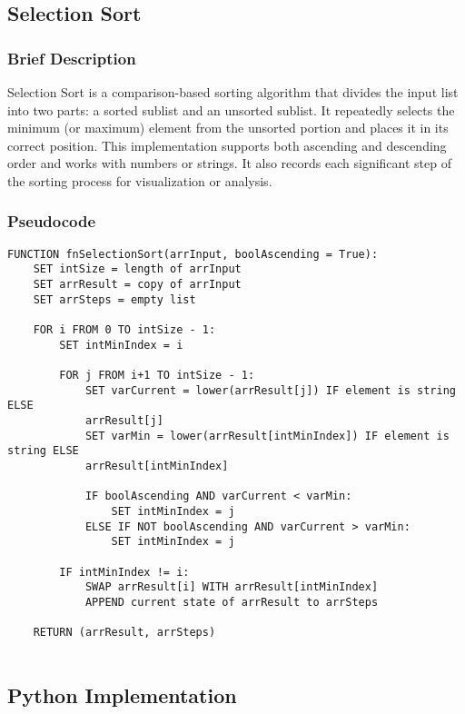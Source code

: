 \documentclass{article}
\begin{document}
\subsection{Selection Sort}
\subsubsection*{Brief Description}
Selection Sort is a comparison-based sorting algorithm that divides the input list into two parts: a sorted sublist and an unsorted sublist. It repeatedly selects the minimum (or maximum) element from the unsorted portion and places it in its correct position. This implementation supports both ascending and descending order and works with numbers or strings. It also records each significant step of the sorting process for visualization or analysis.
\subsubsection*{Pseudocode}
\begin{lstlisting}
FUNCTION fnSelectionSort(arrInput, boolAscending = True):
    SET intSize = length of arrInput
    SET arrResult = copy of arrInput
    SET arrSteps = empty list

    FOR i FROM 0 TO intSize - 1:
        SET intMinIndex = i

        FOR j FROM i+1 TO intSize - 1:
            SET varCurrent = lower(arrResult[j]) IF element is string ELSE 
            arrResult[j]
            SET varMin = lower(arrResult[intMinIndex]) IF element is string ELSE 
            arrResult[intMinIndex]

            IF boolAscending AND varCurrent < varMin:
                SET intMinIndex = j
            ELSE IF NOT boolAscending AND varCurrent > varMin:
                SET intMinIndex = j

        IF intMinIndex != i:
            SWAP arrResult[i] WITH arrResult[intMinIndex]
            APPEND current state of arrResult to arrSteps

    RETURN (arrResult, arrSteps)
    
\end{lstlisting}

\subsection*{Python Implementation}
\end{document}
